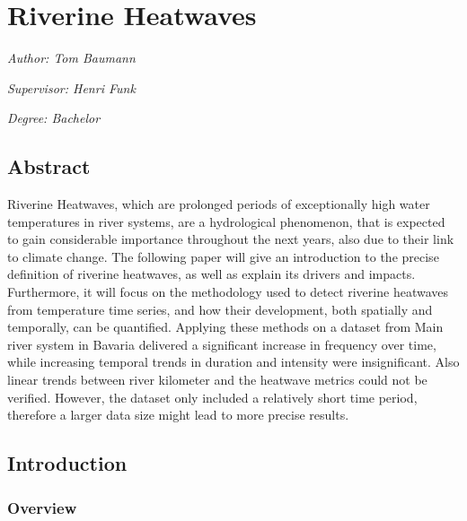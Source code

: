\documentclass[
]{article}
\author{}
\date{\vspace{-2.5em}}
\begin{document}
\section{Riverine Heatwaves}\label{rh}

\emph{Author: Tom Baumann}

\emph{Supervisor: Henri Funk}

\emph{Degree: Bachelor}

\subsection{Abstract}\label{abstract}

Riverine Heatwaves, which are prolonged periods of exceptionally high
water temperatures in river systems, are a hydrological phenomenon, that
is expected to gain considerable importance throughout the next years,
also due to their link to climate change. The following paper will give
an introduction to the precise definition of riverine heatwaves, as well
as explain its drivers and impacts. Furthermore, it will focus on the
methodology used to detect riverine heatwaves from temperature time
series, and how their development, both spatially and temporally, can be
quantified. Applying these methods on a dataset from Main river system
in Bavaria delivered a significant increase in frequency over time,
while increasing temporal trends in duration and intensity were
insignificant. Also linear trends between river kilometer and the
heatwave metrics could not be verified. However, the dataset only
included a relatively short time period, therefore a larger data size
might lead to more precise results.

\subsection{Introduction}\label{introduction}

\subsubsection{Overview}\label{overview}
\end{document}
